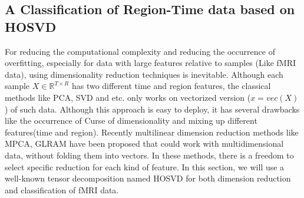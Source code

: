\documentclass[preprint,12pt]{elsarticle}
\begin{document}
	\subsection{ A Classification of Region-Time data  based on  HOSVD}
	For reducing the computational complexity and reducing the occurrence of overfitting, especially for data with large features relative to samples (Like fMRI data), using dimensionality reduction techniques is inevitable. Although each sample $X\in \mathbb{R}^{T\times R}$ has two different time and region features, the classical methods like PCA, SVD and etc. only works on vectorized version ($x=vec(X)$) of such data.
	Although this approach is easy to deploy, it has several drawbacks like the occurrence of Curse of dimensionality and mixing up different features(time and region).
	Recently multilinear dimension reduction methods like MPCA, GLRAM \cite{r60,GLRAM}  have been proposed that
	could work with multidimensional data, without folding them into vectors.
	In these methods, there is a freedom to select specific reduction for each kind of feature. In this section, we will use a well-known tensor decomposition named HOSVD for both dimension reduction and classification of fMRI data.
	
\end{document}
